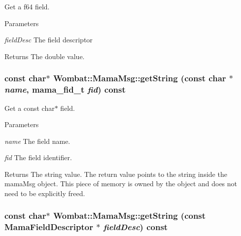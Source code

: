 Get a f64 field. 
\begin{DoxyParams}{Parameters}
\item[{\em fieldDesc}]The field descriptor \end{DoxyParams}
\begin{DoxyReturn}{Returns}
The double value. 
\end{DoxyReturn}
\hypertarget{classWombat_1_1MamaMsg_a0de8f4845b9c00ed88aa28817940305f}{
\subsubsection[{getString}]{\setlength{\rightskip}{0pt plus 5cm}const char$\ast$ Wombat::MamaMsg::getString (const char $\ast$ {\em name}, \/  mama\_\-fid\_\-t {\em fid}) const}}
\label{classWombat_1_1MamaMsg_a0de8f4845b9c00ed88aa28817940305f}


Get a const char$\ast$ field. 
\begin{DoxyParams}{Parameters}
\item[{\em name}]The field name. \item[{\em fid}]The field identifier. \end{DoxyParams}
\begin{DoxyReturn}{Returns}
The string value. The return value points to the string inside the mamaMsg object. This piece of memory is owned by the object and does not need to be explicitly freed. 
\end{DoxyReturn}
\hypertarget{classWombat_1_1MamaMsg_a7b7ff83c75eb5fbfc3c876375d0d9a8f}{
\subsubsection[{getString}]{\setlength{\rightskip}{0pt plus 5cm}const char$\ast$ Wombat::MamaMsg::getString (const {\bf MamaFieldDescriptor} $\ast$ {\em fieldDesc}) const}}
\label{classWombat_1_1MamaMsg_a7b7ff83c75eb5fbfc3c876375d0d9a8f}


